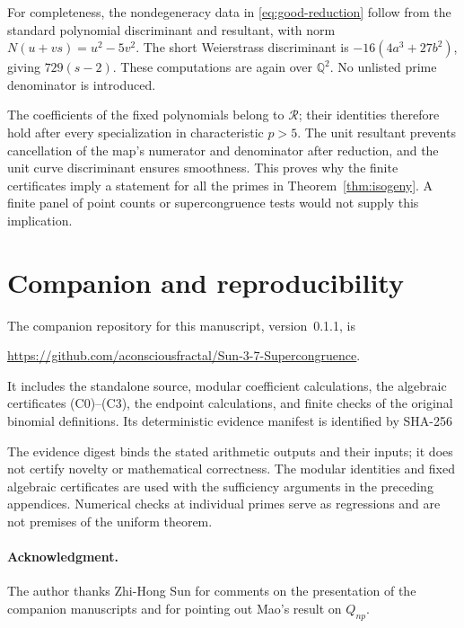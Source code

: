 \documentclass[11pt,a4paper]{article}
\theoremstyle{remark}
\newcommand{\Q}{\mathbb Q}
\begin{document}
For completeness, the nondegeneracy data in
\eqref{eq:good-reduction} follow from the standard polynomial discriminant
and resultant, with norm
$N(u+vs)=u^2-5v^2$. The short Weierstrass discriminant is
$-16(4a^3+27b^2)$, giving $729(s-2)$. These computations are again
over $\Q^2$. No unlisted prime denominator is introduced.

The coefficients of the fixed polynomials belong to $\mathcal R$;
their identities therefore hold after every specialization in
characteristic $p>5$. The unit resultant prevents cancellation of
the map's numerator and denominator after reduction, and the unit
curve discriminant ensures smoothness. This proves why the finite
certificates imply a statement for all the primes in
Theorem~\ref{thm:isogeny}. A finite panel of point counts or
supercongruence tests would not supply this implication.

\section{Companion and reproducibility}\label{app:companion}
The companion repository for this manuscript, version~0.1.1, is
\begin{center}
\url{https://github.com/aconsciousfractal/Sun-3-7-Supercongruence}.
\end{center}
It includes the standalone source, modular coefficient calculations,
the algebraic certificates (C0)--(C3), the endpoint calculations, and
finite checks of the original binomial definitions. Its deterministic
evidence manifest is identified by SHA-256
\begin{center}\ttfamily\small
{}
\end{center}
The evidence digest binds the stated arithmetic outputs and their
inputs; it does not certify novelty or mathematical correctness.
The modular identities and fixed algebraic certificates are used
with the sufficiency arguments in the preceding appendices.
Numerical checks at individual primes serve as regressions and are
not premises of the uniform theorem.

\paragraph{Acknowledgment.}
The author thanks Zhi-Hong Sun for comments on the presentation of
the companion manuscripts and for pointing out Mao's result on $Q_{np}$.
\end{document}
